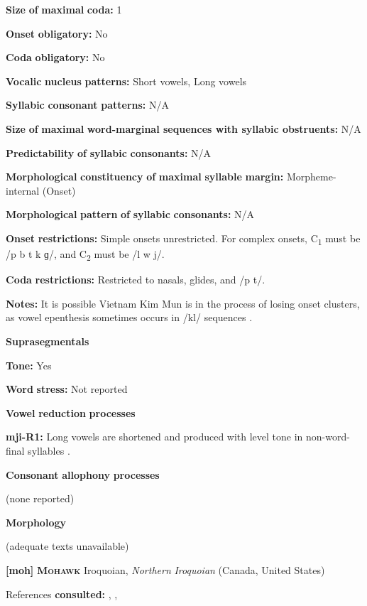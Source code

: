\textbf{Size} \textbf{of} \textbf{maximal} \textbf{coda:} 1

\textbf{Onset} \textbf{obligatory:} No

\textbf{Coda} \textbf{obligatory:} No

\textbf{Vocalic} \textbf{nucleus} \textbf{patterns:} Short vowels, Long vowels

\textbf{Syllabic} \textbf{consonant} \textbf{patterns:} N/A

\textbf{Size} \textbf{of} \textbf{maximal} \textbf{word{}-marginal sequences with syllabic obstruents:} N/A

\textbf{Predictability} \textbf{of} \textbf{syllabic} \textbf{consonants:} N/A

\textbf{Morphological} \textbf{constituency} \textbf{of} \textbf{maximal} \textbf{syllable} \textbf{margin:} Morpheme-internal (Onset)

\textbf{Morphological} \textbf{pattern} \textbf{of} \textbf{syllabic} \textbf{consonants:} N/A

\textbf{Onset} \textbf{restrictions:} Simple onsets unrestricted. For complex onsets, C\textsubscript{1} must be /p b t k ɡ/, and C\textsubscript{2} must be /l w j/. 

\textbf{Coda} \textbf{restrictions:} Restricted to nasals, glides, and /p t/.

\textbf{Notes:} It is possible Vietnam Kim Mun is in the process of losing onset clusters, as vowel epenthesis sometimes occurs in /kl/ sequences \citep[127]{Clark2008}.

\textbf{Suprasegmentals}

\textbf{Tone:} Yes

\textbf{Word} \textbf{stress:} Not reported

\textbf{Vowel} \textbf{reduction} \textbf{processes}

\textbf{mji-R1:} Long vowels are shortened and produced with level tone in non-word-final syllables \citep[117]{Clark2008}.

\textbf{Consonant} \textbf{allophony} \textbf{processes}

(none reported)

\textbf{Morphology}

(adequate texts unavailable)

\textbf{[moh]}   \textbf{\textsc{Mohawk}}  Iroquoian, \textit{Northern} \textit{Iroquoian} (Canada, United States)

References \textbf{consulted:} \citet{Bonvillain1973}, \citet{Michelson1981}, \citet{Michelson1988}

